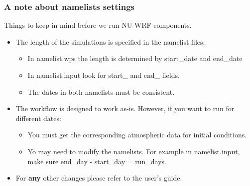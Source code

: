 \begin{frame}[fragile]\frametitle{A note about namelists settings}

Things to keep in mind before we run NU-WRF components.
\mbox{}\\
\begin{itemize}
\item The length of the simulations is specified in the namelist files:
\begin{itemize}
\item In namelist.wps the length is determined by start\_date and end\_date
\item In namelist.input look for start\_ and end\_ fields. 
\item The dates in both namelists must be consistent.
\end{itemize}
\item The workflow is designed to work as-is. However, if you want to run for different dates:
\begin{itemize}
\item You must get the corresponding atmospheric data for initial conditions. 
\item Yo may need to modify the namelists. For example in namelist.input, make sure end\_day - start\_day = run\_days.
\end{itemize}
\item For \textbf{any} other changes please refer to the user's guide.
\end{itemize}

\end{frame}



